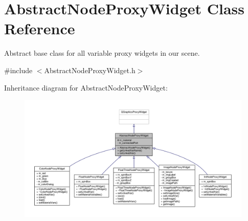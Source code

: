 \hypertarget{class_abstract_node_proxy_widget}{\section{Abstract\-Node\-Proxy\-Widget Class Reference}
\label{class_abstract_node_proxy_widget}
}


Abstract base class for all variable proxy widgets in our scene.  




{\ttfamily \#include $<$Abstract\-Node\-Proxy\-Widget.\-h$>$}



Inheritance diagram for Abstract\-Node\-Proxy\-Widget\-:
\nopagebreak
\begin{figure}[H]
\begin{center}
\leavevmode
\includegraphics[width=350pt]{class_abstract_node_proxy_widget__inherit__graph}
\end{center}
\end{figure}


